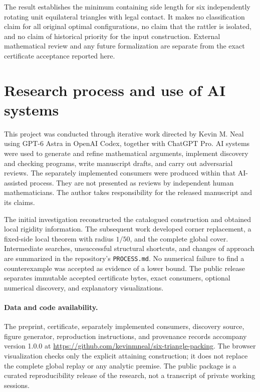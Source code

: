 \documentclass[11pt]{article}
\begin{document}
The result establishes the minimum containing side length for six independently rotating unit equilateral triangles with legal contact. It makes no classification claim for all original optimal configurations, no claim that the rattler is isolated, and no claim of historical priority for the input construction. External mathematical review and any future formalization are separate from the exact certificate acceptance reported here.

\section*{Research process and use of AI systems}

This project was conducted through iterative work directed by Kevin M. Neal using GPT-6 Astra in OpenAI Codex, together with ChatGPT Pro. AI systems were used to generate and refine mathematical arguments, implement discovery and checking programs, write manuscript drafts, and carry out adversarial reviews. The separately implemented consumers were produced within that AI-assisted process. They are not presented as reviews by independent human mathematicians. The author takes responsibility for the released manuscript and its claims.

The initial investigation reconstructed the catalogued construction and obtained local rigidity information. The subsequent work developed corner replacement, a fixed-side local theorem with radius $1/50$, and the complete global cover. Intermediate searches, unsuccessful structural shortcuts, and changes of approach are summarized in the repository's \texttt{PROCESS.md}. No numerical failure to find a counterexample was accepted as evidence of a lower bound. The public release separates immutable accepted certificate bytes, exact consumers, optional numerical discovery, and explanatory visualizations.

\paragraph{Data and code availability.}
The preprint, certificate, separately implemented consumers, discovery source, figure generator, reproduction instructions, and provenance records accompany version 1.0.0 at
\url{https://github.com/kevinmneal/six-triangle-packing}.
The browser visualization checks only the explicit attaining construction; it does not replace the complete global replay or any analytic premise. The public package is a curated reproducibility release of the research, not a transcript of private working sessions.
\end{document}
